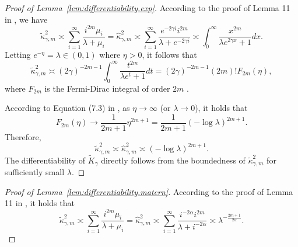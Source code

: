 \documentclass[12pt]{article}
\newcommand{\s}{\sum_{i=1}^{\infty}}
\theoremstyle{plain}
\theoremstyle{nonitalicremark}
\begin{document}
\begin{appendices}
\begin{proof}[Proof of Lemma~\ref{lem:differentiability.exp}]
According to the proof of Lemma 11 in \cite{liu2020non}, we have
\begin{equation}
\tilde{\kappa}_{\gamma,m}^2 \asymp \s \frac{i^{2m}\mu_i}{\lambda + \mu_i} = \hat{\kappa}_{\gamma,m}^2 \asymp \sum_{i=1}^{\infty}\frac{e^{-2\gamma i}i^{2m}}{\lambda + e^{-2\gamma i}} \asymp \int_{0}^{\infty} \frac{x^{2m}}{\lambda e^{2 \gamma x} + 1} dx.
\end{equation}
Letting $e^{-\eta} = \lambda \in (0, 1)$ where $\eta > 0$, it follows that
\begin{equation}
\tilde{\kappa}_{\gamma,m}^2\asymp  (2\gamma)^{-2m-1} \int_{0}^{\infty} \frac{t^{2m}}{\lambda e^t+1}dt = (2\gamma)^{-2m-1} (2m)! F_{2m}(\eta),
\end{equation}
where $F_{2m}$ is the Fermi-Dirac integral of order $2m$ \citep{mcdougall1938computation}.

According to Equation (7.3) in \cite{mcdougall1938computation}, as $\eta \rightarrow \infty$ (or $\lambda \rightarrow 0$), it holds that
\begin{equation}
F_{2m}(\eta) \rightarrow \frac{1}{2m + 1} \eta^{2m + 1} = \frac{1}{2m + 1}(-\log \lambda)^{2m + 1}. 
\end{equation}
Therefore,
\begin{equation}
\tilde{\kappa}_{\gamma,m}^2 \asymp \hat{\kappa}_{\gamma,m}^2 \asymp (-\log \lambda)^{2m + 1}.
\end{equation}
The differentiability of $\tilde{K}_\gamma$ directly follows from the boundedness of $\tilde{\kappa}^2_{\gamma,m}$ for sufficiently small $\lambda$.
\end{proof}


\begin{proof}[Proof of Lemma~\ref{lem:differentiability.matern}]

According to the proof of Lemma 11 in \cite{liu2020non}, it holds that
\begin{equation}
\tilde{\kappa}_{\gamma,m}^2 \asymp \s \frac{i^{2m}\mu_i}{\lambda + \mu_i} = \hat{\kappa}_{\gamma,m}^2 \asymp \sum_{i=1}^{\infty}\frac{i^{-2\alpha}i^{2m}}{\lambda + i^{-2\alpha}} \asymp \lambda^{-\frac{2m+1}{2\alpha}}.
\end{equation}
\end{proof}



\end{appendices}
\end{document}
